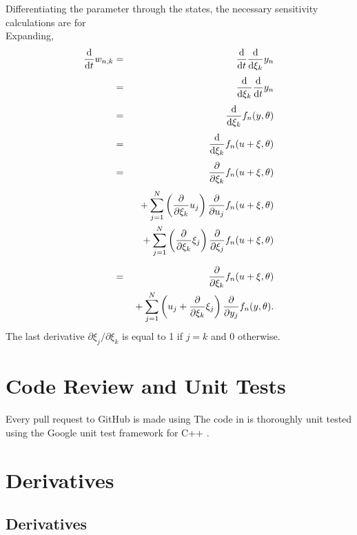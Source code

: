 \documentclass[10pt]{article}
\begin{document}
Differentiating the parameter through the states, the necessary
sensitivity calculations are for
%
\[
\]
Expanding, 
%
\begin{eqnarray*}
\frac{\mbox{d}}{\mbox{d} t} w_{n,k}
& = & \frac{\mbox{d}}{\mbox{d} t} \frac{\mbox{d}}{\mbox{d} \xi_{k}} y_n
\\[3pt]
& = & \frac{\mbox{d}}{\mbox{d} \xi_k} \frac{\mbox{d}}{\mbox{d} t} y_n
\\[3pt]
& = & \frac{\mbox{d}}{\mbox{d} \xi_k} f_n(y,\theta)
\\[3pt]
& = & \frac{\mbox{d}}{\mbox{d} \xi_k} f_n(u + \xi, \theta)
\\[3pt]
& = & \frac{\partial}{\partial \xi_k} f_n(u + \xi, \theta)
\\[3pt]
& & 
{ } + \sum_{j=1}^N 
        \left( \frac{\partial}{\partial \xi_k} u_j \right)
           \frac{\partial}{\partial u_j} f_n(u + \xi, \theta)
\\
& & 
 { } + \sum_{j=1}^N
         \left( \frac{\partial}{\partial \xi_k} \xi_j \right)
         \frac{\partial}{\partial \xi_j} f_n(u + \xi, \theta)
\\[6pt]
& = & 
\frac{\partial}{\partial \xi_k} f_n(u + \xi, \theta)
\\
& & { } + \sum_{j=1}^N \left( u_j + \frac{\partial}{\partial \xi_k} \xi_j
\right)
\frac{\partial}{\partial y_j} f_n(y,\theta).
\end{eqnarray*}
%
The last derivative $\partial \xi_j / \partial \xi_k$ is equal to 1 if
$j = k$ and 0 otherwise.





\section{Code Review and Unit Tests}

Every pull request to GitHub is made using 
The code in  is thoroughly unit tested using the
Google unit test framework for C++ \citep{GoogleTest:2014}.






\clearpage
\appendix

\section{Derivatives}\label{derivative-definitions.section}

\subsection{Derivatives}
\end{document}
